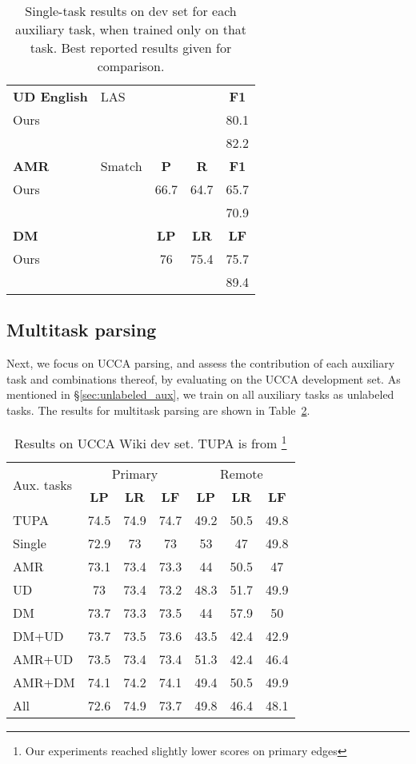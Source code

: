 \documentclass[11pt,a4paper]{article}
\begin{document}
\begin{table}
\begin{tabular}{ll|ccc}
\textbf{UD English} & \small LAS & & & \textbf{F1} \\
Ours & & & & 80.1 \\
\multicolumn{2}{l|}{\citet{dozat2016deep}} &&& 82.2 \\
\hline
\textbf{AMR} & \small Smatch & \textbf{P} & \textbf{R} & \textbf{F1} \\
Ours & & 66.7 & 64.7 & 65.7 \\
\multicolumn{2}{l|}{\citet{foland2017abstract}} &&& 70.9 \\
\hline
\textbf{DM} & & \textbf{LP} & \textbf{LR} & \textbf{LF} \\
Ours & & 76 & 75.4 & 75.7 \\
\multicolumn{2}{l|}{\citet{thomson-EtAl:2014:SemEval}} &&& 89.4
\end{tabular}
\caption{Single-task results on dev set for each auxiliary task,
when trained only on that task.
Best reported results given for comparison.
\label{tab:single}}
\end{table}


\subsection{Multitask parsing}\label{sec:results_multi}

Next, we focus on UCCA parsing, and assess the contribution of each auxiliary task
and combinations thereof, by evaluating on the UCCA development set.
As mentioned in \S\ref{sec:unlabeled_aux}, we train on all auxiliary tasks as unlabeled tasks.
The results for multitask parsing are shown in Table~\ref{tab:multi}.

\begin{table}
\begin{tabular}{l|ccc|ccc}
\multirow{2}{1cm}{Aux. tasks} & \multicolumn{3}{c|}{Primary} & \multicolumn{3}{c}{Remote} \\
& \textbf{LP} & \textbf{LR} & \textbf{LF} & \textbf{LP} & \textbf{LR} & \textbf{LF} \\
\hline
TUPA & 74.5 & 74.9 & 74.7 & 49.2 & 50.5 & 49.8 \\
\hline
Single & 72.9 & 73 & 73 &53 & 47 & 49.8 \\
AMR & 73.1 & 73.4 & 73.3 & 44 & 50.5 & 47\\
UD & 73 & 73.4 & 73.2 & 48.3 & 51.7 & 49.9 \\
DM & 73.7 & 73.3 & 73.5 & 44 & 57.9 & 50 \\
\tiny DM+UD & 73.7 & 73.5 & 73.6 & 43.5 & 42.4 & 42.9 \\
\tiny AMR+UD & 73.5 & 73.4 & 73.4 & 51.3 & 42.4 & 46.4 \\
\tiny AMR+DM & 74.1 & 74.2 & 74.1 & 49.4 & 50.5 & 49.9 \\
All & 72.6 & 74.9 & 73.7 & 49.8 & 46.4 & 48.1
\end{tabular}
\caption{Results on UCCA Wiki dev set.
TUPA is from \citet{hershcovich2017a}\footnote{Our experiments
    reached slightly lower scores on primary edges}\label{tab:multi}}
\end{table}
\end{document}
